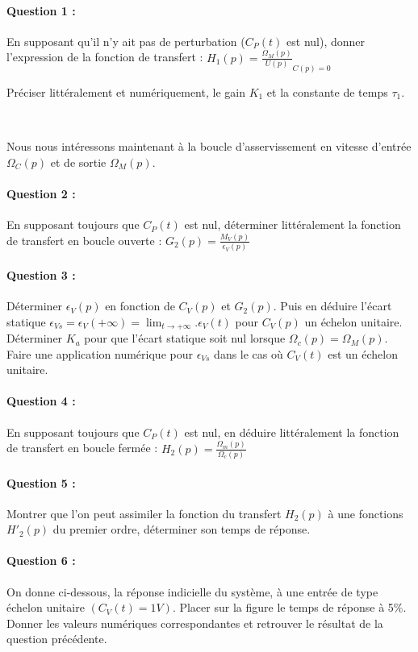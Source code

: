 \paragraph{Question 1 :} En supposant qu'il n'y ait pas de perturbation ($C_P(t)$ est nul), donner l'expression de la fonction de transfert : $H_1(p)=\frac{\Omega_M(p)}{U(p)}_{C(p)=0}$

Préciser littéralement et numériquement, le gain $K_1$ et la constante de temps $\tau_1$.

~\

Nous nous intéressons maintenant à la boucle d'asservissement en vitesse d'entrée $\Omega_C(p)$ et de sortie $\Omega_M(p)$.

\paragraph{Question 2 :} En supposant toujours que $C_P(t)$ est nul, déterminer littéralement la fonction de transfert en boucle ouverte : $G_2(p)=\frac{M_V(p)}{\epsilon_V(p)}$	

\paragraph{Question 3 :} Déterminer $\epsilon_V(p)$ en fonction de $C_V(p)$ et $G_2(p)$. Puis en déduire l'écart statique
$ \displaystyle \epsilon_{Vs}=\epsilon_V(+\infty)=\lim_{t\rightarrow + \infty}.\epsilon_V(t)$ pour $C_V(p)$ un échelon unitaire. Déterminer $K_a$ pour que l'écart statique soit nul lorsque $\Omega_c(p)=\Omega_M(p)$. Faire une application numérique pour $\epsilon_{Vs}$ dans le cas où $C_V(t)$ est un échelon unitaire.

\paragraph{Question 4 :} En supposant toujours que $C_P(t)$ est nul, en déduire littéralement la fonction de transfert en boucle fermée : $H_2(p)=\frac{\Omega_m(p)}{\Omega_c(p)}$	

\paragraph{Question 5 :} Montrer que l'on peut assimiler la fonction du transfert $H_2(p)$ à une fonctions $H'_2(p)$ du premier ordre, déterminer son temps de réponse.

\paragraph{Question 6 :} On donne ci-dessous, la réponse indicielle du système, à une entrée de type échelon unitaire $(C_V(t)=1V)$. Placer sur la figure le temps de réponse à 5\%. Donner les valeurs numériques correspondantes et retrouver le résultat de la question précédente.

